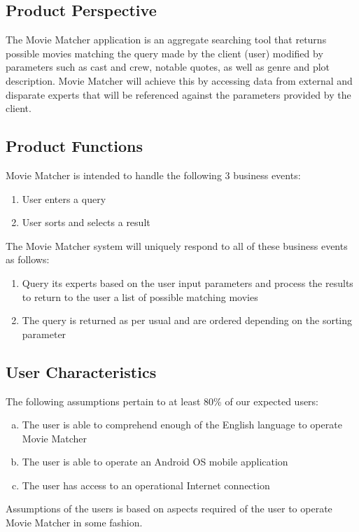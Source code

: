 \documentclass[]{article}
\begin{document}
\subsection{Product Perspective}
\label{sub:product_perspective}
The Movie Matcher application is an aggregate searching tool that returns possible movies matching the query made by the client (user) modified by parameters such as cast and crew, notable quotes, as well as genre and plot description. Movie Matcher will achieve this by accessing data from external and disparate experts that will be referenced against the parameters provided by the client.

\subsection{Product Functions}
\label{sub:product_functions}
Movie Matcher is intended to handle the following 3 business events:
\begin{enumerate}
	\item User enters a query
	\item User sorts and selects a result
\end{enumerate}
The Movie Matcher system will uniquely respond to all of these business events as follows:
\begin{enumerate}
\item Query its experts based on the user input parameters and process the results to return to the user a list of possible matching movies
\item The query is returned as per usual and are ordered depending on the sorting parameter
\end{enumerate}

\subsection{User Characteristics}
\label{sub:user_characteristics}
The following assumptions pertain to at least 80\% of our expected users:
\begin{enumerate}[a)]
	\item The user is able to comprehend enough of the English language to operate Movie Matcher
	\item The user is able to operate an Android OS mobile application
	\item The user has access to an operational Internet connection
\end{enumerate}
Assumptions of the users is based on aspects required of the user to operate Movie Matcher in some fashion.
\end{document}
